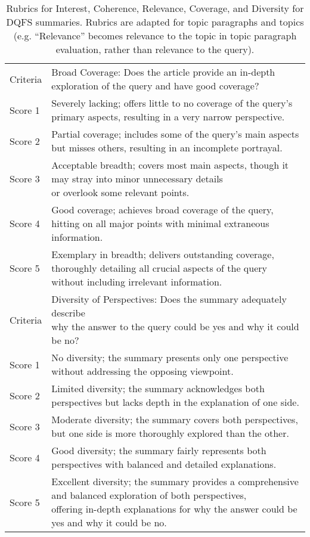 \begin{table*}[]
\begin{tabular}{@{}ll@{}}
Criteria & Broad Coverage: Does the article provide an in-depth exploration of the query and have good coverage? \\
Score 1 & Severely lacking; offers little to no coverage of the query's primary aspects, resulting in a very narrow perspective. \\
Score 2 & Partial coverage; includes some of the query's main aspects but misses others, resulting in an incomplete portrayal. \\
Score 3 & \specialcellleft{Acceptable breadth; covers most main aspects, though it may stray into minor unnecessary details\\ or overlook some relevant points.} \\
Score 4 & \specialcellleft{Good coverage; achieves broad coverage of the query,\\hitting on all major points with minimal extraneous information.} \\
Score 5 & \specialcellleft{Exemplary in breadth; delivers outstanding coverage,\\thoroughly detailing all crucial aspects of the query without including irrelevant information.} \\ \midrule
Criteria & \specialcellleft{Diversity of Perspectives: Does the summary adequately describe\\why the answer to the query could be yes and why it could be no?} \\
Score 1 & No diversity; the summary presents only one perspective without addressing the opposing viewpoint. \\
Score 2 & Limited diversity; the summary acknowledges both perspectives but lacks depth in the explanation of one side. \\
Score 3 & Moderate diversity; the summary covers both perspectives, but one side is more thoroughly explored than the other. \\
Score 4 & Good diversity; the summary fairly represents both perspectives with balanced and detailed explanations. \\
Score 5 & \specialcellleft{Excellent diversity; the summary provides a comprehensive and balanced exploration of both perspectives,\\offering in-depth explanations for why the answer could be yes and why it could be no.} \\ \bottomrule
\end{tabular}
\caption{\label{table:rubric} Rubrics for Interest, Coherence, Relevance, Coverage, and Diversity for DQFS summaries. Rubrics are adapted for topic paragraphs and topics (e.g. ``Relevance'' becomes relevance to the topic in topic paragraph evaluation, rather than relevance to the query).}
\end{table*}